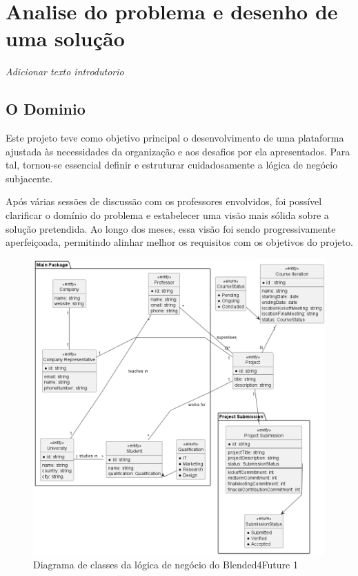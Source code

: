 \chapter{Analise do problema e desenho de uma solução}
\label{chap:analisedoproblema}

\textit{Adicionar texto introdutorio}

\section{O Dominio}

Este projeto teve como objetivo principal o desenvolvimento de uma plataforma ajustada às necessidades da organização e aos desafios por ela apresentados. Para tal, tornou-se essencial definir e estruturar cuidadosamente a lógica de negócio subjacente.

Após várias sessões de discussão com os professores envolvidos, foi possível clarificar o domínio do problema e estabelecer uma visão mais sólida sobre a solução pretendida. Ao longo dos meses, essa visão foi sendo progressivamente aperfeiçoada, permitindo alinhar melhor os requisitos com os objetivos do projeto.

\begin{figure}    
    \centering
    \includegraphics[width=\linewidth]{capitulos/cap3-analisedoproblema/assets/domain-diagram/dd.png}
    \caption{Diagrama de classes da lógica de negócio do Blended4Future 1}
    \label{fig:dd}
\end{figure}


